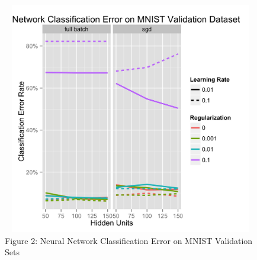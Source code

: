 \documentclass[10pt]{article}
\begin{document}
\begin{figure}[ht]
\center
\includegraphics[height=4in, width=5in]{nnperf.jpg}
\caption*{Figure 2: Neural Network Classification Error on MNIST Validation Sets}
\end{figure}
	
\end{document}
